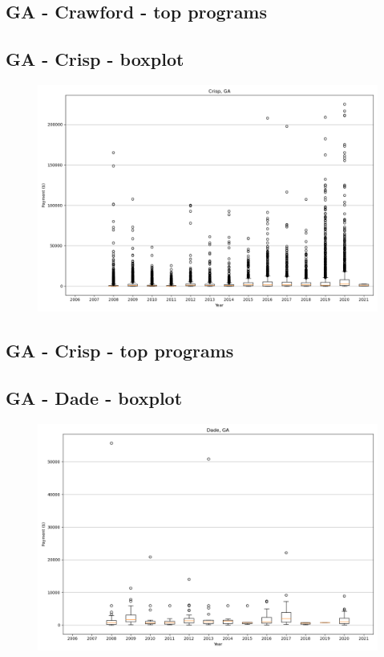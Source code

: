\subsection*{GA - Crawford - top programs}

\newpage
\subsection*{GA - Crisp - boxplot}
\begin{figure}[h]
\centering
\includegraphics[width=7in]{../output/boxplots/counties/Crisp-GA_boxplot.png}
\end{figure}


\subsection*{GA - Crisp - top programs}

\newpage
\subsection*{GA - Dade - boxplot}
\begin{figure}[h]
\centering
\includegraphics[width=7in]{../output/boxplots/counties/Dade-GA_boxplot.png}
\end{figure}


